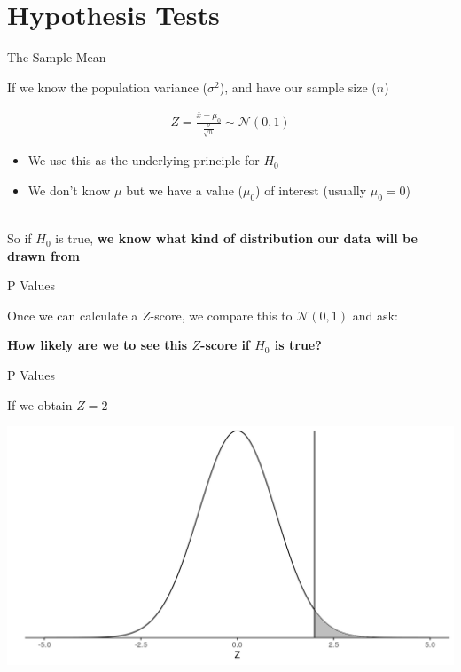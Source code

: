 \documentclass[aspectratio=169,11pt]{beamer}
\begin{document}
\section{Hypothesis Tests}

\begin{frame}{The Sample Mean}

If we know the population variance ($\sigma^2$), and have our sample size ($n$)

	\begin{align*}
		Z = \frac{\bar{x} - \mu_0}{\frac{\sigma}{\sqrt{n}}} \sim \mathcal{N}(0, 1)
	\end{align*}
	\begin{itemize}
		\item We use this as the underlying principle for $H_0$
		\item We don't know $\mu$ but we have a value ($\mu_0$) of interest (usually $\mu_0 = 0$)
	\end{itemize}
	~\\
	So if $H_0$ is true, \textbf{we know what kind of distribution our data will be drawn from}

\end{frame}

\begin{frame}{P Values}

	Once we can calculate a $Z$-score, we compare this to $\mathcal{N}(0, 1)$ and ask:\\
	
	\begin{center}
	\textbf{How likely are we to see this $Z$-score if $H_0$ is true?}	
	\end{center}

\end{frame}

\begin{frame}{P Values}

If we obtain $Z = 2$

	\begin{center}
		\includegraphics[scale=0.5]{figures/z2.png} 
	\end{center}

\end{frame}
\end{document}

